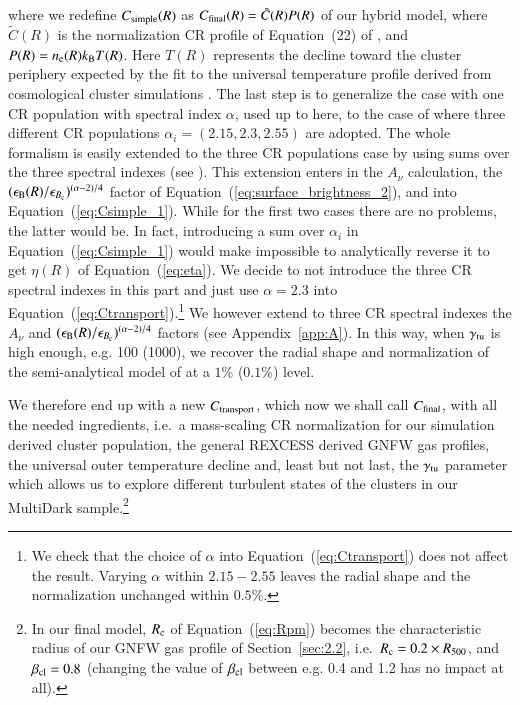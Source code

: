 \documentclass[traditabstract]{aa}
\begin{document}
where we redefine $C_{\rm{simple}}(R)$ as $C_{\rm{final}}(R) = \tilde{C}(R) P(R) $ of our hybrid model, where $\tilde{C}(R)$ is the normalization CR profile of Equation~(22) of \cite{2010MNRAS.409..449P}, and $P(R) = n_{\rm{e}}(R) k_{\rm{B}} T(R)$. Here $T(R)$ represents the decline toward the cluster periphery expected by the fit to the universal temperature profile derived from cosmological cluster simulations \citep{2007MNRAS.378..385P,2010MNRAS.409..449P}. The last step is to generalize the case with one CR population with spectral index $\alpha$, used up to here, to the case of \cite{2010MNRAS.409..449P} where three different CR populations $\alpha_{i}=(2.15,2.3,2.55)$ are adopted. The whole formalism is easily extended to the three CR populations case by using sums over the three spectral indexes (see \citealp{2010MNRAS.409..449P}). This extension enters in the $A_{\nu}$ calculation, the $(\epsilon_{\rm{B}}(R)/\epsilon_{B_{\rm{c}}})^{(\alpha-2)/4}$ factor of Equation~(\ref{eq:surface_brightness_2}), and into Equation~(\ref{eq:Csimple_1}). While for the first two cases there are no problems, the latter would be. In fact, introducing a sum over $\alpha_{i}$ in Equation~(\ref{eq:Csimple_1}) would make impossible to analytically reverse it to get $\eta(R)$ of Equation~(\ref{eq:eta}). We decide to not introduce the three CR spectral indexes in this part and just use $\alpha = 2.3$ into Equation~(\ref{eq:Ctransport}).\footnote[9]{We check that the choice of $\alpha$ into Equation~(\ref{eq:Ctransport}) does not affect the result. Varying $\alpha$ within $2.15-2.55$ leaves the radial shape and the normalization unchanged within $0.5\%$.} We however extend to three CR spectral indexes the $A_{\nu}$ and $(\epsilon_{\rm{B}}(R)/\epsilon_{B_{\rm{c}}})^{(\alpha-2)/4}$ factors (see Appendix~\ref{app:A}). In this way, when $\gamma_{\rm{tu}}$ is high enough, e.g. 100 (1000), we recover the radial shape and normalization of the semi-analytical model of \cite{2010MNRAS.409..449P} at a $1\%$ ($0.1\%$) level.

We therefore end up with a new $C_{\rm{transport}}$, which now we shall call $C_{\rm{final}}$, with all the needed ingredients, i.e.~a mass-scaling CR normalization for our simulation derived cluster population, the general REXCESS derived GNFW gas profiles, the universal outer temperature decline and, least but not last, the $\gamma_{\rm{tu}}$ parameter which allows us to explore different turbulent states of the clusters in our MultiDark sample.\footnote[10]{In our final model, $R_{\rm{c}}$ of Equation~(\ref{eq:Rpm}) becomes the characteristic radius of our GNFW gas profile of Section~\ref{sec:2.2}, i.e.~$R_{\rm{c}}=0.2\times R_{500}$, and $\beta_{\rm{cl}}=0.8$ (changing the value of $\beta_{\rm{cl}}$ between e.g. 0.4 and 1.2 has no impact at all).}
\end{document}
